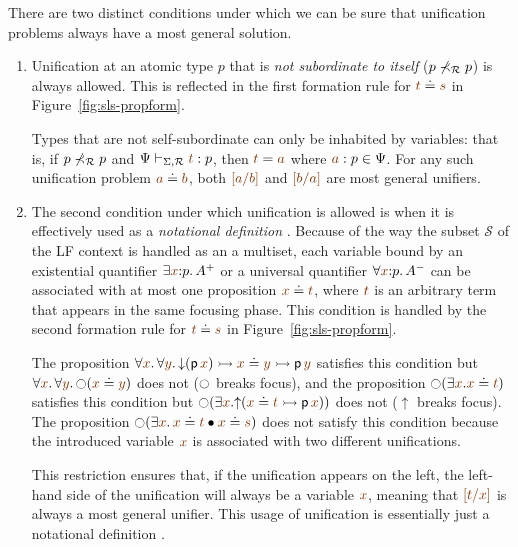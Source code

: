 There are two distinct conditions under which we can be sure that
unification problems always have a most general solution.  \smallskip
\begin{enumerate}
\item Unification at an atomic type $p$ that is {\it not subordinate
    to itself} ($p \not\prec_\mathcal R p$) is always allowed.  This is
  reflected in the first formation rule for $\lf{t} \doteq
  \lf{s}$ in Figure~\ref{fig:sls-propform}. 

  Types that are not self-subordinate can only be inhabited by
  variables: that is, if $p \not\prec_\mathcal R p$ and $\Psi
  \vdash_{\Sigma,\subord} \lf{t} : p$, then $\lf{t} = \lf{{a}}$ where
  $\lf{a}:p \in \Psi$. For any such unification problem $\lf{{a}}
  \doteq \lf{{b}}$, both $\lf{[{a}/b]}$ and $\lf{[{b}/a]}$ are most
  general unifiers.

\item The second condition under which unification is allowed is when
  it is effectively used as a {\it notational definition}
  \cite{pfenning99algorithms}. Because of the way the subset $\mathcal
  S$ of the LF context is handled as an a multiset, each variable
  bound by an existential quantifier $\exists \lf{x}{:}p.\,A^+$ or a
  universal quantifier $\forall \lf{x}{:}p.\,A^-$ can be associated
  with at most one proposition $\lf{x} \doteq \lf{t}$, where $\lf{t}$
  is an arbitrary term that appears in the same focusing phase. This
  condition is handled by the second formation rule for $\lf{t} \doteq
  \lf{s}$ in Figure~\ref{fig:sls-propform}.

  The proposition $\forall \lf{x}.\, \forall \lf{y}.\,
  {\downarrow}({\sf p}\,\lf{x}) \lefti \lf{x} \doteq \lf{y} \lefti
  {\sf p}\,\lf{y}$ satisfies this condition but $\forall
  \lf{x}.\,\forall \lf{y}.\,{\ocircle}(\lf{x} \doteq \lf{y})$ does not
  ($\ocircle$ breaks focus), and the proposition ${\ocircle}(\exists
  \lf{x}. \lf{x} \doteq \lf{t})$ satisfies this condition but
  ${\ocircle}(\exists \lf{x}.  {\uparrow}(\lf{x} \doteq \lf{t} \lefti
  {\sf p}\,\lf{x}))$ does not (${\uparrow}$ breaks focus).  The
  proposition ${\ocircle}(\exists \lf{x}.\, \lf{x} \doteq \lf{t} \fuse
  \lf{x} \doteq \lf{s})$ does not satisfy this condition because the
  introduced variable $\lf{x}$ is associated with two different
  unifications. 

  This restriction ensures that, if the unification appears on the
  left, the left-hand side of the unification will always be a
  variable $\lf{x}$, meaning that $\lf{[t/x]}$ is always a most
  general unifier.  This usage of unification is essentially just a
  notational definition \cite{pfenning99algorithms}.
\end{enumerate}
\smallskip

